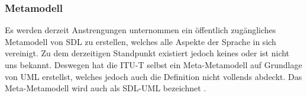 \subsubsection{Metamodell}
\label{ssc:Metamodell}
Es werden derzeit Anstrengungen unternommen ein öffentlich zugängliches Metamodell von \ac{SDL} zu erstellen, welches alle Aspekte der Sprache in sich vereinigt. Zu dem derzeitigen Standpunkt existiert jedoch keines oder ist nicht uns bekannt. Deswegen hat die \ac{ITU-T} selbst ein Meta-Metamodell auf Grundlage von 
\ac{UML} erstellst, welches jedoch auch die Definition nicht vollends abdeckt. Das Meta-Metamodell wird auch als SDL-UML bezeichnet \cite[18]{ITUT109_2016}.
